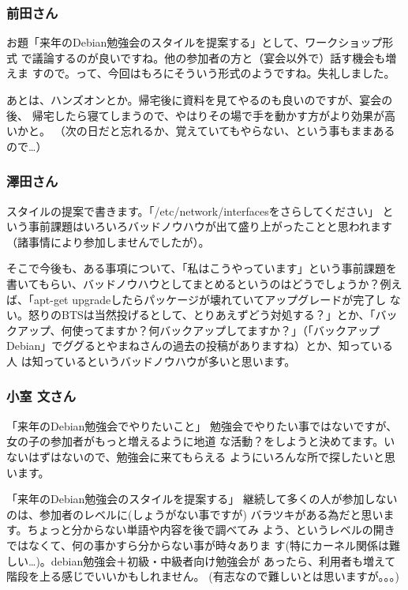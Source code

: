 \documentclass[cjk,dvipdfmx]{beamer}
\begin{document}
\begin{frame}
 
 \frametitle{前田さん}


 お題「来年のDebian勉強会のスタイルを提案する」として、ワークショップ形式
 で議論するのが良いですね。他の参加者の方と（宴会以外で）話す機会も増えま
 すので。って、今回はもろにそういう形式のようですね。失礼しました。

 あとは、ハンズオンとか。帰宅後に資料を見てやるのも良いのですが、宴会の後、
 帰宅したら寝てしまうので、やはりその場で手を動かす方がより効果が高いかと。
 （次の日だと忘れるか、覚えていてもやらない、という事もままあるので…）
\end{frame}
\begin{frame}
 
 \frametitle{澤田さん}

 スタイルの提案で書きます。「/etc/network/interfacesをさらしてください」
 という事前課題はいろいろバッドノウハウが出て盛り上がったことと思われます
 （諸事情により参加しませんでしたが）。

 そこで今後も、ある事項について、「私はこうやっています」という事前課題を
 書いてもらい、バッドノウハウとしてまとめるというのはどうでしょうか？例え
 ば、「apt-get upgradeしたらパッケージが壊れていてアップグレードが完了し
 ない。怒りのBTSは当然投げるとして、とりあえずどう対処する？」とか、「バッ
 クアップ、何使ってますか？何バックアップしてますか？」（「バックアップ 
 Debian」でググるとやまねさんの過去の投稿がありますね）とか、知っている人
 は知っているというバッドノウハウが多いと思います。
\end{frame}
\begin{frame}
 

 \frametitle{小室 文さん}

 「来年のDebian勉強会でやりたいこと」
 勉強会でやりたい事ではないですが、女の子の参加者がもっと増えるように地道
 な活動？をしようと決めてます。いないはずはないので、勉強会に来てもらえる
 ようにいろんな所で探したいと思います。


 「来年のDebian勉強会のスタイルを提案する」
 継続して多くの人が参加しないのは、参加者のレベルに(しょうがない事ですが)
 バラツキがある為だと思います。ちょっと分からない単語や内容を後で調べてみ
 よう、というレベルの開きではなくて、何の事かすら分からない事が時々ありま
 す(特にカーネル関係は難しい…)。debian勉強会＋初級・中級者向け勉強会が
 あったら、利用者も増えて階段を上る感じでいいかもしれません。
 (有志なので難しいとは思いますが。。。)
\end{frame}
\end{document}

